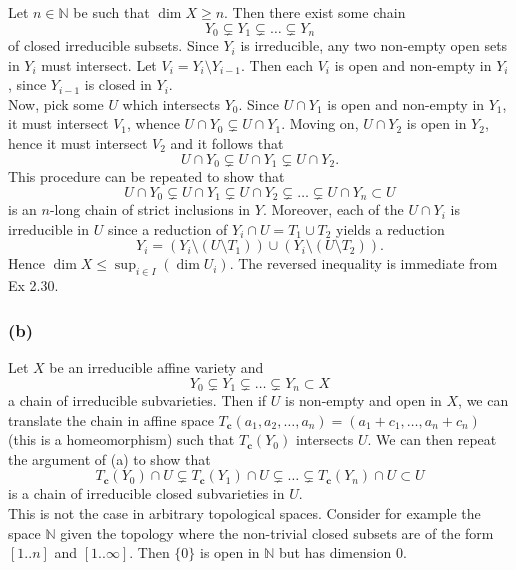 \documentclass{article}
\theoremstyle{definition}
\newcommand{\N}{\mathbb{N}}
\begin{document}
Let $n \in \N$ be such that $\dim X \geq n$. Then there exist some chain
\[
Y_0 \subsetneq Y_1 \subsetneq \ldots \subsetneq Y_n
\] 
of closed irreducible subsets. Since $Y_i$ is irreducible, any two non-empty
open sets in $Y_i$ must intersect. Let $V_i = Y_i \setminus Y_{i - 1}$. Then
each $V_i$ is open and non-empty in $Y_i$, since $Y_{i - 1}$ is closed in
$Y_i$. \\

Now, pick some $U$ which intersects $Y_0$. Since $U \cap Y_1$ is open and
non-empty in $Y_1$, it must intersect $V_1$, whence $U \cap Y_0 \subsetneq
U \cap Y_1$. Moving on, $U \cap Y_2$ is open in $Y_2$, hence it must
intersect $V_2$ and it follows that 
\[
	U \cap Y_0 \subsetneq U \cap Y_1 \subsetneq U \cap Y_2.
\] 
This procedure can be repeated to show that 
\[
	U \cap Y_0 \subsetneq U \cap Y_1 \subsetneq U \cap Y_2 \subsetneq
	\ldots \subsetneq U \cap Y_n \subset U
\] 
is an $n$-long chain of strict inclusions in $Y$. Moreover, each of the $U
\cap Y_i$ is irreducible in $U$ since a reduction of $Y_i \cap U = T_1 \cup
T_2$ yields a reduction
\[
	Y_i 
	= 
	(Y_i \setminus (U \setminus T_1))
	\cup
	(Y_i \setminus (U \setminus T_2)).
\]
Hence $\dim X \leq \sup_{i \in I}(\dim U_i)$. The reversed inequality
is immediate from Ex 2.30.

\subsubsection*{(b)} 

Let $X$ be an irreducible affine variety and 
\[
Y_0 \subsetneq Y_1 \subsetneq \ldots \subsetneq Y_n \subset X
\] 
a chain of irreducible subvarieties. Then if $U$ is non-empty and open in $X$,
we can translate the chain in affine space $T_{\bm{c}}(a_1, a_2, \ldots, a_n) =
(a_1 + c_1, \ldots, a_n + c_n)$ (this is a homeomorphism) such that
$T_{\bm{c}}(Y_0)$ intersects $U$. We can then repeat the argument of (a) to
show that 
\[
	T_{\bm{c}}(Y_0) \cap U \subsetneq T_{\bm{c}}(Y_1) \cap U \subsetneq \ldots
	\subsetneq T_{\bm{c}}(Y_n) \cap U \subset U
\] 
is a chain of irreducible closed subvarieties in $U$. \\

This is not the case in arbitrary topological spaces. Consider for example the
space $\N$ given the topology where the non-trivial closed subsets are of the
form $[1..n]$ and $[1..\infty]$. Then $\{0\}$ is open in $\N$ but has dimension
$0$. \\
\end{document}
